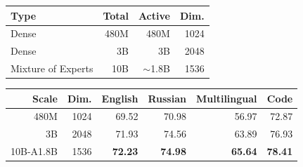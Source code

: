 \documentclass{article}
\begin{document}
\begin{table}[!t]
  \centering
  \begin{minipage}[t]{0.35\textwidth}
    \vspace{0pt}
    \label{tab:architecture}
    \centering
    \small
    \setlength{\tabcolsep}{3.5pt}
    \begin{tabular}{lrrr}
      \toprule
      \textbf{Type} & \textbf{Total} & \textbf{Active} & \textbf{Dim.} \\
      \midrule
      Dense      & 480M & 480M & 1024 \\
      Dense      & 3B & 3B & 2048 \\
      Mixture of Experts & 10B & $\sim$1.8B & 1536 \\
      \bottomrule
    \end{tabular}
  \end{minipage}
  \hfill
  \begin{minipage}[t]{0.62\textwidth}
    \vspace{0pt}
    \label{tab:main}
    \centering
    \small
    \setlength{\tabcolsep}{3.5pt}
    \begin{tabular}{rrrrrr}
      \toprule
      \textbf{Scale} & \textbf{Dim.} & \textbf{English} & \textbf{Russian} & \textbf{Multilingual} & \textbf{Code} \\
      \midrule
      480M       & 1024 & 69.52 & 70.98 & 56.97 & 72.87 \\
      3B         & 2048 & 71.93 & 74.56 & 63.89 & 76.93 \\
      10B-A1.8B  & 1536 & \textbf{72.23} & \textbf{74.98} & \textbf{65.64} & \textbf{78.41} \\
      \bottomrule
    \end{tabular}
  \end{minipage}
\end{table}
\end{document}
